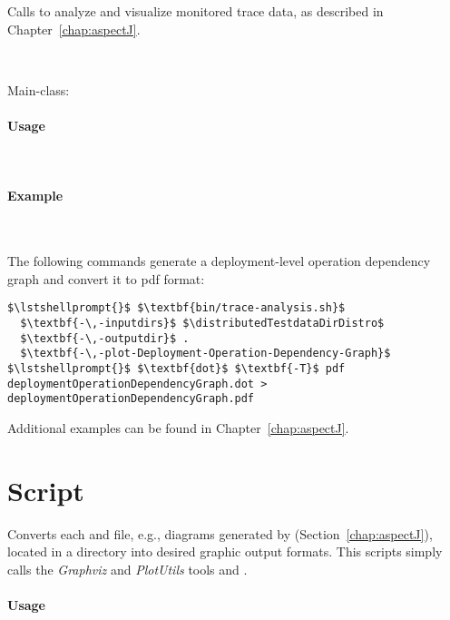 Calls \KiekerTraceAnalysis{} to analyze and visualize monitored trace data, %
as described in Chapter~\ref{chap:aspectJ}.

\

\noindent Main-class: {\small {}}

\pagebreak

\paragraph*{Usage}\

\enlargethispage{0.6cm}

\setTextListing


\paragraph*{Example}\

\noindent The following commands generate a deployment-level operation dependency 
graph and convert it to pdf format:

\enlargethispage{1cm}

\setTextListing
\begin{lstlisting}
$\lstshellprompt{}$ $\textbf{bin/trace-analysis.sh}$
  $\textbf{-\,-inputdirs}$ $\distributedTestdataDirDistro$ 
  $\textbf{-\,-outputdir}$ . 
  $\textbf{-\,-plot-Deployment-Operation-Dependency-Graph}$
$\lstshellprompt{}$ $\textbf{dot}$ $\textbf{-T}$ pdf  deploymentOperationDependencyGraph.dot > deploymentOperationDependencyGraph.pdf
\end{lstlisting}

\noindent Additional examples can be found in Chapter~\ref{chap:aspectJ}.

\section{Script }\label{appendix:wrapperScripts:dotPicFileConverter}

Converts each  and  file, e.g., diagrams generated by %
\KiekerTraceAnalysis{} (Section~\ref{chap:aspectJ}), located in a directory %
into desired graphic output formats. %
This scripts simply calls the \textit{Graphviz} and \textit{PlotUtils} tools  and .

\paragraph*{Usage}\

